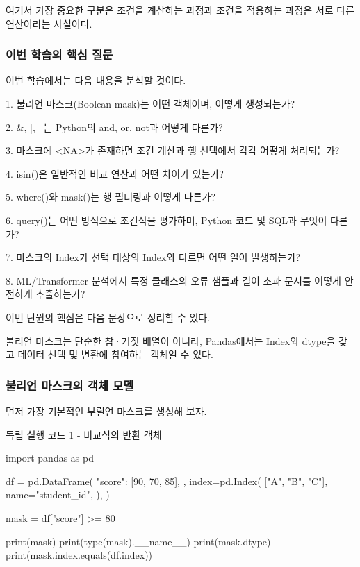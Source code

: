 여기서 가장 중요한 구분은 조건을 계산하는 과정과 조건을 적용하는 과정은 서로 다른 연산이라는 사실이다.

\subsubsection{이번 학습의 핵심 질문}

이번 학습에서는 다음 내용을 분석할 것이다.

\begin{dhksmry}
1. 불리언 마스크(Boolean mask)는 어떤 객체이며, 어떻게 생성되는가?

2. &, |, ~는 Python의 and, or, not과 어떻게 다른가?

3. 마스크에 <NA>가 존재하면 조건 계산과 행 선택에서 각각 어떻게 
   처리되는가?

4. isin()은 일반적인 비교 연산과 어떤 차이가 있는가?

5. where()와 mask()는 행 필터링과 어떻게 다른가?

6. query()는 어떤 방식으로 조건식을 평가하며, Python 코드 및 SQL과 
   무엇이 다른가?

7. 마스크의 Index가 선택 대상의 Index와 다르면 어떤 일이 발생하는가?

8. ML/Transformer 분석에서 특정 클래스의 오류 샘플과 길이 초과 문서를 
   어떻게 안전하게 추출하는가?
\end{dhksmry}

이번 단원의 핵심은 다음 문장으로 정리할 수 있다.

불리언 마스크는 단순한 참·거짓 배열이 아니라, Pandas에서는 Index와 dtype을 갖고 데이터 선택 및 변환에 참여하는 객체일 수 있다.

\subsubsection{불리언 마스크의 객체 모델}

먼저 가장 기본적인 부릴언 마스크를 생성해 보자.

\begin{dhknote}
\begin{dhksmry}[centered]
독립 실행 코드 1 - 비교식의 반환 객체
\end{dhksmry}
\end{dhknote}

\begin{dhkcode}
import pandas as pd

df = pd.DataFrame(
    {
        "score": [90, 70, 85],
    },
    index=pd.Index(
        ["A", "B", "C"],
        name="student_id",
    ),
)

mask = df["score"] >= 80

print(mask)
print(type(mask).__name__)
print(mask.dtype)
print(mask.index.equals(df.index))
\end{dhkcode}

